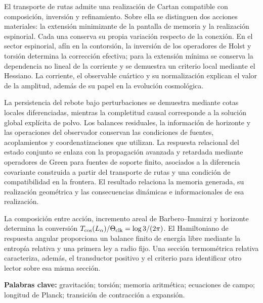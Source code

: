 El transporte de rutas admite una realización de Cartan compatible con
composición, inversión y refinamiento. Sobre ella se distinguen dos
acciones materiales: la extensión minimizante de la pantalla de memoria
y la realización espinorial. Cada una conserva su propia variación
respecto de la conexión. En el sector espinorial, afín en la contorsión,
la inversión de los operadores de Holst y torsión determina la corrección
efectiva; para la extensión mínima se conserva la dependencia no lineal
de la corriente y se demuestra un criterio local mediante el Hessiano.
La corriente, el observable cuártico y su normalización explican el
valor de la amplitud, además de su papel en la evolución cosmológica.

La persistencia del rebote bajo perturbaciones se demuestra mediante
cotas locales diferenciadas, mientras la completitud causal corresponde
a la solución global explícita de polvo. Los balances residuales, la
información de horizonte y las operaciones del observador conservan las
condiciones de fuentes, acoplamientos y coordenatizaciones que utilizan. La respuesta
relacional del estado conjunto se enlaza con la propagación avanzada y
retardada mediante operadores de Green para fuentes de soporte finito,
asociados a la diferencia covariante
construida a partir del transporte de rutas y una condición de
compatibilidad en la frontera. El resultado relaciona la memoria
generada, su realización geométrica y las consecuencias dinámicas e
informacionales de esa realización.

La composición entre acción, incremento areal de Barbero--Immirzi y
horizonte determina la conversión
\(T_{\rm cos}(L_\alpha)/\Theta_{\rm clk}=\log3/(2\pi)\).
El Hamiltoniano de respuesta angular proporciona un balance finito de
energía libre mediante la entropía relativa y una primera ley a radio
fijo. Una sección termométrica relativa caracteriza, además, el
transductor positivo y el criterio para identificar otro lector sobre
esa misma sección.

\noindent\textbf{Palabras clave:} gravitación; torsión; memoria aritmética; ecuaciones de campo; longitud de Planck; transición de contracción a expansión.
\par\endgroup

